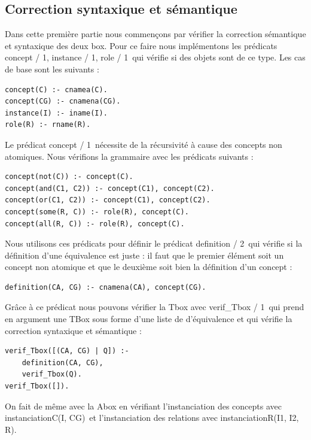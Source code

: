 \documentclass{article}
\begin{document}
\subsection{Correction syntaxique et sémantique}
Dans cette première partie nous commençons par vérifier la correction sémantique et syntaxique des deux box. Pour ce faire nous implémentons les prédicats \color{blue}concept / 1, instance / 1, role / 1\color{black}\ qui vérifie si des objets sont de ce type. Les cas de base sont les suivants :

\begin{verbatim}
concept(C) :- cnamea(C).
concept(CG) :- cnamena(CG). 
instance(I) :- iname(I).
role(R) :- rname(R). 
\end{verbatim}

Le prédicat \color{blue}concept / 1\color{black}\ nécessite de la récursivité à cause des concepts non atomiques. Nous vérifions la grammaire avec les prédicats suivants :

\begin{verbatim}
concept(not(C)) :- concept(C).
concept(and(C1, C2)) :- concept(C1), concept(C2).
concept(or(C1, C2)) :- concept(C1), concept(C2).
concept(some(R, C)) :- role(R), concept(C).
concept(all(R, C)) :- role(R), concept(C).
\end{verbatim}

Nous utilisons ces prédicats pour définir le prédicat \color{blue}definition / 2\color{black}\ qui vérifie si la définition d'une équivalence est juste : il faut que le premier élément soit un concept non atomique et que le deuxième soit bien la définition d'un concept :
\begin{verbatim}
definition(CA, CG) :- cnamena(CA), concept(CG).
\end{verbatim}

Grâce à ce prédicat nous pouvons vérifier la Tbox avec \color{blue}verif\_Tbox / 1\color{black}\ qui prend en argument une TBox sous forme d'une liste de d'équivalence et qui vérifie la correction syntaxique et sémantique : 
\begin{verbatim}
verif_Tbox([(CA, CG) | Q]) :- 
    definition(CA, CG), 
    verif_Tbox(Q).
verif_Tbox([]).
\end{verbatim}
On fait de même avec la Abox en vérifiant l'instanciation des concepts avec \color{blue}instanciationC(I, CG)\color{black}\ et l'instanciation des relations avec \color{blue}instanciationR(I1, I2, R)\color{black}.
\end{document}
